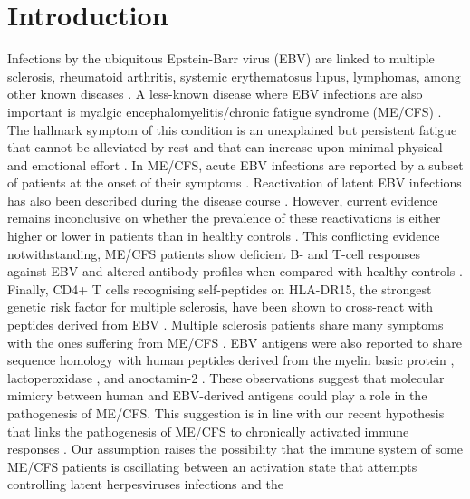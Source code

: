 \section{Introduction}

Infections by the ubiquitous Epstein-Barr virus (EBV) are linked to multiple sclerosis, rheumatoid arthritis, systemic erythematosus lupus, lymphomas, among other known diseases \citep{shannon-lowe2017EpsteinBarr, houen2021EpsteinBarrVirus, bjornevik2022LongitudinalAnalysis}. A less-known disease where EBV infections are also important is myalgic encephalomyelitis/chronic fatigue syndrome (ME/CFS) \citep{koo1989ChronicFatigue, rasa2018ChronicViral, ruiz-pablos2021EpsteinBarrVirus}. The hallmark symptom of this condition is an unexplained but persistent fatigue that cannot be alleviated by rest and that can increase upon minimal physical and emotional effort \citep{rivera2019MyalgicEncephalomyelitis, bateman2021MyalgicEncephalomyelitis}. In ME/CFS, acute EBV infections are reported by a subset of patients at the onset of their symptoms \citep{hickie2006PostinfectiveChronicb, domingues2021HerpesvirusesSerologya}. Reactivation of latent EBV infections has also been described during the disease course \citep{shikovaCytomegalovirusEpsteinBarrVirus2020}. However, current evidence remains inconclusive on whether the prevalence of these reactivations is either higher or lower in patients than in healthy controls \citep{lee2021SalivaryDNA}. This conflicting evidence notwithstanding, ME/CFS patients show deficient B- and T-cell responses against EBV and altered antibody profiles when compared with healthy controls \citep{lerner2012AntibodyEpsteinBarr, loebelDeficientEBVSpecificTCell2014, kerr2019EpsteinBarrVirus, domingues2021HerpesvirusesSerologya}. Finally, CD4+ T cells recognising self-peptides on HLA-DR15, the strongest genetic risk factor for multiple sclerosis, have been shown to cross-react with peptides derived from EBV \citep{wang2020HLADR15Molecules}. Multiple sclerosis patients share many symptoms with the ones suffering from ME/CFS \citep{morrisMyalgicEncephalomyelitisChronic2013, gaberMultipleSclerosisChronic2014, malato2021Statisticalchallenges}. EBV antigens were also reported to share sequence homology with human peptides derived from the myelin basic protein \citep{wucherpfennig1995MolecularMimicry, holmoy2004CerebrospinalFluid, lunemann2008EBNA1specificCells}, lactoperoxidase \citep{loebel2017SerologicalProfiling}, and anoctamin-2 \citep{tengvall2019MolecularMimicry, sepulveda2021ImpactGenetic}. These observations suggest that molecular mimicry between human and EBV-derived antigens could play a role in the pathogenesis of ME/CFS. This suggestion is in line with our recent hypothesis that links the pathogenesis of ME/CFS to chronically activated immune responses \citep{sepulveda2019MyalgicEncephalomyelitis}. Our assumption raises the possibility that the immune system of some ME/CFS patients is oscillating between an activation state that attempts controlling latent herpesviruses infections and the 